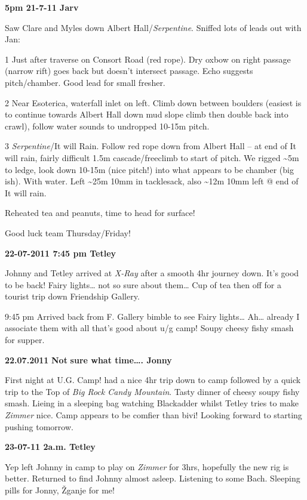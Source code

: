 \textbf{5pm 21-7-11 Jarv}

Saw Clare and Myles down Albert Hall/\emph{Serpentine}. Sniffed lots of
leads out with Jan:

1 Just after traverse on Consort Road (red rope). Dry oxbow on right
passage (narrow rift) goes back but doesn't intersect passage. Echo
suggests pitch/chamber. Good lead for small fresher.

2 Near Esoterica, waterfall inlet on left. Climb down between boulders
(easiest is to continue towards Albert Hall down mud slope climb then
double back into crawl), follow water sounds to undropped 10-15m pitch.

3 \emph{Serpentine}/It will Rain. Follow red rope down from Albert Hall
-- at end of It will rain, fairly difficult 1.5m cascade/freeclimb to
start of pitch. We rigged \textasciitilde{}5m to ledge, look down 10-15m
(nice pitch!) into what appears to be chamber (big ish). With water.
Left \textasciitilde{}25m 10mm in tacklesack, also \textasciitilde{}12m
10mm left @ end of It will rain.

Reheated tea and peanuts, time to head for surface!

Good luck team Thursday/Friday!

\textbf{22-07-2011 7:45 pm Tetley}

Johnny and Tetley arrived at \emph{X-Ray} after a smooth 4hr journey
down. It's good to be back! Fairy lights\ldots{} not so sure about
them\ldots{} Cup of tea then off for a tourist trip down Friendship
Gallery.

9:45 pm Arrived back from F. Gallery bimble to see Fairy lights\ldots{}
Ah\ldots{} already I associate them with all that's good about u/g camp!
Soupy cheesy fishy smash for supper.

\textbf{22.07.2011} \textbf{Not} \textbf{sure what time\ldots{}. Jonny}

First night at U.G. Camp! had a nice 4hr trip down to camp followed by a
quick trip to the Top of \emph{Big Rock Candy Mountain}. Tasty dinner of
cheesy soupy fishy smash. Lieing in a sleeping bag watching Blackadder
whilst Tetley tries to make \emph{Zimmer} nice. Camp appears to be
comfier than bivi! Looking forward to starting pushing tomorrow.

\textbf{23-07-11 2a.m. Tetley}

Yep left Johnny in camp to play on \emph{Zimmer} for 3hrs, hopefully the
new rig is better. Returned to find Johnny almost asleep. Listening to
some Bach. Sleeping pills for Jonny, Žganje for me!

